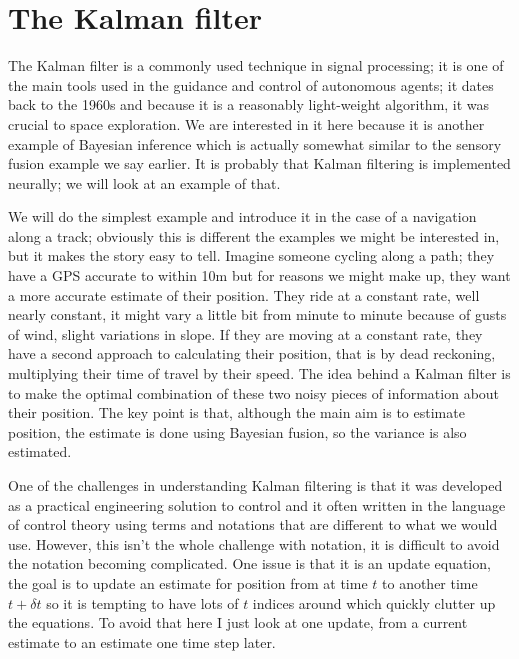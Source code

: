 \documentclass[12pt]{article}
\begin{document}
\section*{The Kalman filter}

The Kalman filter is a commonly used technique in signal processing;
it is one of the main tools used in the guidance and control of
autonomous agents; it dates back to the 1960s and because it is a
reasonably light-weight algorithm, it was crucial to space
exploration. We are interested in it here because it is another
example of Bayesian inference which is actually somewhat similar to
the sensory fusion example we say earlier. It is probably that Kalman
filtering is implemented neurally; we will look at an example of that.

We will do the simplest example and introduce it in the case of a
navigation along a track; obviously this is different the examples we
might be interested in, but it makes the story easy to tell. Imagine
someone cycling along a path; they have a GPS accurate to within 10m
but for reasons we might make up, they want a more accurate estimate
of their position. They ride at a constant rate, well nearly constant,
it might vary a little bit from minute to minute because of gusts of
wind, slight variations in slope. If they are moving at a constant
rate, they have a second approach to calculating their position, that
is by dead reckoning, multiplying their time of travel by their
speed. The idea behind a Kalman filter is to make the optimal
combination of these two noisy pieces of information about their
position. The key point is that, although the main aim is to estimate
position, the estimate is done using Bayesian fusion, so the variance
is also estimated.

One of the challenges in understanding Kalman filtering is that it was
developed as a practical engineering solution to control and it often
written in the language of control theory using terms and notations
that are different to what we would use. However, this isn't the whole
challenge with notation, it is difficult to avoid the notation
becoming complicated. One issue is that it is an update equation, the
goal is to update an estimate for position from at time $t$ to another
time $t+\delta t$ so it is tempting to have lots of $t$ indices around
which quickly clutter up the equations. To avoid that here I just look
at one update, from a current estimate to an estimate one time step later.
\end{document}
